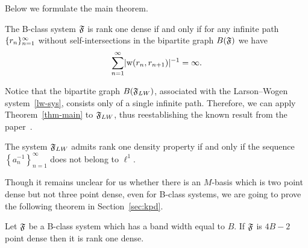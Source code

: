 \documentclass[12pt,oneside,a4paper]{amsart}
\begin{document}
    \medskip
    Below we formulate the main theorem.
    \begin{theorem}
      \label{thm-main}
      The B-class system $\mathfrak{F}$ is rank one dense if and only if
        for any infinite path $\{{r}_n\}_{n=1}^\infty$ without self-intersections in the bipartite graph $B(\mathfrak{F})$
        we have
        \[
          \sum_{n=1}^\infty\lvert\mathrm{w}(r_n, r_{n+1})\rvert^{-1} = \infty.
        \]
    \end{theorem}
    Notice that the bipartite graph $B(\mathfrak{F}_{LW})$, associated with the Larson--Wogen system~\eqref{lw-sys},
      consists only of a single infinite path.
    Therefore, we can apply Theorem~\ref{thm-main} to $\mathfrak{F}_{LW}$, thus reestablishing
      the known result from the paper~\cite{katavolos}.
    \begin{corol}
      The system $\mathfrak{F}_{LW}$ admits rank one density property if and only if
        the sequence $\left\{a_n^{-1}\right\}_{n=1}^\infty$ does not belong to $\ell^1$.
    \end{corol}

    Though it remains unclear for us whether there is an $M$-basis which is two point dense but not three point dense,
      even for B-class systems, we are going to prove the following theorem in Section~\ref{sec:kpd}.
    \begin{theorem}
      \label{thm-kpd}
      Let $\mathfrak{F}$ be a B-class system which has a band width equal to $B$.
      If $\mathfrak{F}$ is $4B - 2$ point dense then it is rank one dense.
    \end{theorem}

\end{document}
